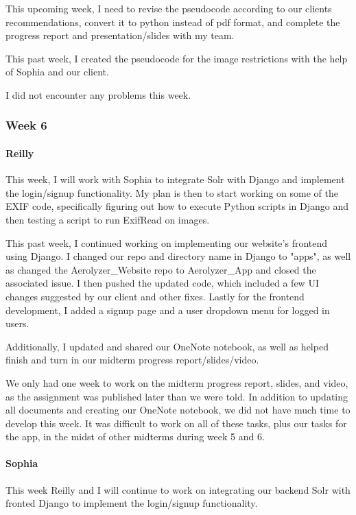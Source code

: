 \documentclass[onecolumn, draftclsnofoot,10pt, compsoc]{IEEEtran}
\begin{document}
\begin{flushleft}
This upcoming week, I need to revise the pseudocode according to our clients recommendations, convert it to python instead of pdf format, and complete the progress report and presentation/slides with my team.
 
 
This past week, I created the pseudocode for the image restrictions with the help of Sophia and our client.
 
 
I did not encounter any problems this week.
 
\subsubsection{Week 6}
\paragraph{Reilly}
 
This week, I will work with Sophia to integrate Solr with Django and implement the login/signup functionality. My plan is then to start working on some of the EXIF code, specifically figuring out how to execute Python scripts in Django and then testing a script to run ExifRead on images.
 
 
This past week, I continued working on implementing our website's frontend using Django. I changed our repo and directory name in Django to "apps", as well as changed the Aerolyzer\_Website repo to Aerolyzer\_App and closed the associated issue. I then pushed the updated code, which included a few UI changes suggested by our client and other fixes. Lastly for the frontend development, I added a signup page and a user dropdown menu for logged in users.
 
Additionally, I updated and shared our OneNote notebook, as well as helped finish and turn in our midterm progress report/slides/video.
 
 
We only had one week to work on the midterm progress report, slides, and video, as the assignment was published later than we were told. In addition to updating all documents and creating our OneNote notebook, we did not have much time to develop this week. It was difficult to work on all of these tasks, plus our tasks for the app, in the midst of other midterms during week 5 and 6.
 
\paragraph{Sophia}
 
This week Reilly and I will continue to work on integrating our backend Solr with fronted Django to implement the login/signup functionality.
 

\end{flushleft}
\end{document}
